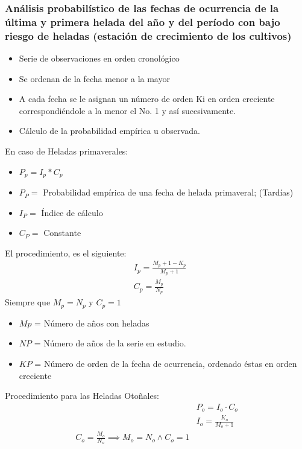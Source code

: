 \subsubsection{Análisis probabilístico de las fechas de ocurrencia de la última y primera helada del año y del período con bajo riesgo de heladas (estación de crecimiento de los cultivos)}
\begin{itemize}
    \item Serie de observaciones en orden cronológico
    \item Se ordenan de la fecha menor a la mayor
    \item A cada fecha se le asignan un número de orden Ki en orden creciente correspondiéndole a la menor el No. 1 y así sucesivamente.
    \item Cálculo de la probabilidad empírica u observada.
\end{itemize}
En caso de Heladas primaverales:
\begin{notation}
    \begin{itemize}
        \item $P_p = I_p * C_p$
        \item $P_P=$ Probabilidad empírica de una fecha de helada primaveral; (Tardías)
        \item $I_P=$ Índice de cálculo
        \item $C_P=$ Constante
    \end{itemize}
\end{notation}
El procedimiento, es el siguiente:
\begin{align}
    &I_p = \frac{M_p + 1 - K_p}{M_p + 1}\\
    &C_p= \frac{M_p}{N_p}
\end{align}
Siempre que $M_p=N_p$ y $C_p=1$
\begin{notation}
    \begin{itemize}
        \item $Mp$ = Número de años con heladas
        \item $NP$ = Número de años de la serie en estudio.
        \item $KP$ = Número de orden de la fecha de ocurrencia, ordenado éstas en orden creciente 
    \end{itemize}
    \end{notation}
    Procedimiento para las Heladas Otoñales:
    \begin{align}
        &P_o=I_o\cdot C_o\\
        &I_o=\frac{K_o}{M_o+1}\\
        C_o = \frac{M_o}{N_o}\implies M_o = N_o\land C_o = 1
    \end{align}
